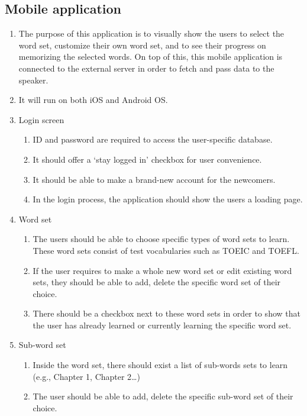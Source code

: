 \documentclass[conference]{IEEEtran}
\begin{document}
\subsection{Mobile application}

\begin{enumerate}
\item The purpose of this application is to visually show the users to select the word set, customize their own word set, and to see their progress on memorizing the selected words. On top of this, this mobile application is connected to the external server in order to fetch and pass data to the speaker.
\item It will run on both iOS and Android OS.
\item Login screen
    \begin{enumerate}
    \item ID and password are required to access the user-specific database.
    \item It should offer a ‘stay logged in’ checkbox for user convenience.
    \item It should be able to make a brand-new account for the newcomers.
    \item In the login process, the application should show the users a loading page.
    \end{enumerate}
\item Word set
    \begin{enumerate}
    \item The users should be able to choose specific types of word sets to learn. These word sets consist of test vocabularies such as TOEIC and TOEFL.
    \item If the user requires to make a whole new word set or edit existing word sets, they should be able to add, delete the specific word set of their choice.
    \item There should be a checkbox next to these word sets in order to show that the user has already learned or currently learning the specific word set.
    \end{enumerate}
\item Sub-word set
    \begin{enumerate}
    \item Inside the word set, there should exist a list of sub-words sets to learn (e.g., Chapter 1, Chapter 2…)
    \item The user should be able to add, delete the specific sub-word set of their choice.

\end{enumerate}
\end{enumerate}
\end{document}
